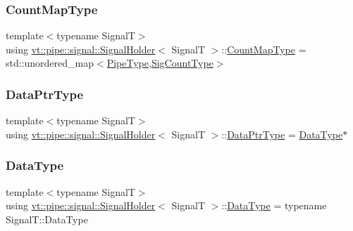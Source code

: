 \subsubsection{\texorpdfstring{Count\+Map\+Type}{CountMapType}}
{\footnotesize\ttfamily template$<$typename SignalT$>$ \\
using \hyperlink{structvt_1_1pipe_1_1signal_1_1_signal_holder}{vt\+::pipe\+::signal\+::\+Signal\+Holder}$<$ SignalT $>$\+::\hyperlink{structvt_1_1pipe_1_1signal_1_1_signal_holder_ade6904d6f651a864bf2e5a657a4b1a13}{Count\+Map\+Type} =  std\+::unordered\+\_\+map$<$\hyperlink{namespacevt_ac9852acda74d1896f48f406cd72c7bd3}{Pipe\+Type},\hyperlink{structvt_1_1pipe_1_1signal_1_1_signal_holder_aced54515f402b63f6dea174e5b027c81}{Sig\+Count\+Type}$>$}

\mbox{\label{structvt_1_1pipe_1_1signal_1_1_signal_holder_aad5bfc2b46dfa071ae638385324d7e31}} 
\subsubsection{\texorpdfstring{Data\+Ptr\+Type}{DataPtrType}}
{\footnotesize\ttfamily template$<$typename SignalT$>$ \\
using \hyperlink{structvt_1_1pipe_1_1signal_1_1_signal_holder}{vt\+::pipe\+::signal\+::\+Signal\+Holder}$<$ SignalT $>$\+::\hyperlink{structvt_1_1pipe_1_1signal_1_1_signal_holder_aad5bfc2b46dfa071ae638385324d7e31}{Data\+Ptr\+Type} =  \hyperlink{structvt_1_1pipe_1_1signal_1_1_signal_holder_a4c1ad2d2a961f4d381d9c9455bc0d901}{Data\+Type}$\ast$}

\mbox{\label{structvt_1_1pipe_1_1signal_1_1_signal_holder_a4c1ad2d2a961f4d381d9c9455bc0d901}} 
\subsubsection{\texorpdfstring{Data\+Type}{DataType}}
{\footnotesize\ttfamily template$<$typename SignalT$>$ \\
using \hyperlink{structvt_1_1pipe_1_1signal_1_1_signal_holder}{vt\+::pipe\+::signal\+::\+Signal\+Holder}$<$ SignalT $>$\+::\hyperlink{structvt_1_1pipe_1_1signal_1_1_signal_holder_a4c1ad2d2a961f4d381d9c9455bc0d901}{Data\+Type} =  typename Signal\+T\+::\+Data\+Type}

